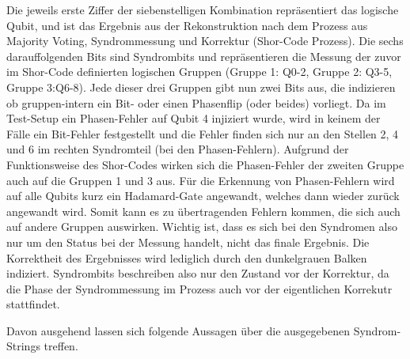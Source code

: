 Die jeweils erste Ziffer der siebenstelligen Kombination repräsentiert das logische Qubit, und ist das Ergebnis aus der Rekonstruktion nach dem Prozess aus Majority Voting, Syndrommessung und Korrektur (Shor-Code Prozess).
Die sechs darauffolgenden Bits sind Syndrombits und repräsentieren die Messung der zuvor im Shor-Code definierten logischen Gruppen (Gruppe 1: Q0-2, Gruppe 2: Q3-5, Gruppe 3:Q6-8).
Jede dieser drei Gruppen gibt nun zwei Bits aus, die indizieren ob gruppen-intern ein Bit- oder einen Phasenflip (oder beides) vorliegt. Da im Test-Setup ein Phasen-Fehler auf Qubit 4 injiziert wurde, wird in keinem der Fälle ein Bit-Fehler festgestellt und die Fehler finden sich nur an den Stellen 2, 4 und 6 im rechten Syndromteil (bei den Phasen-Fehlern). 
Aufgrund der Funktionsweise des Shor-Codes wirken sich die Phasen-Fehler der zweiten Gruppe auch auf die Gruppen 1 und 3 aus. Für die Erkennung von Phasen-Fehlern wird auf alle Qubits kurz ein Hadamard-Gate angewandt, welches dann wieder zurück angewandt wird. Somit kann es zu übertragenden Fehlern kommen, die sich auch auf andere Gruppen auswirken.
Wichtig ist, dass es sich bei den Syndromen also nur um den Status bei der Messung handelt, nicht das finale Ergebnis. Die Korrektheit des Ergebnisses wird lediglich durch den dunkelgrauen Balken indiziert.
Syndrombits beschreiben also nur den Zustand vor der Korrektur, da die Phase der Syndrommessung im Prozess auch vor der eigentlichen Korrekutr stattfindet.

Davon ausgehend lassen sich folgende Aussagen über die ausgegebenen Syndrom-Strings treffen.

